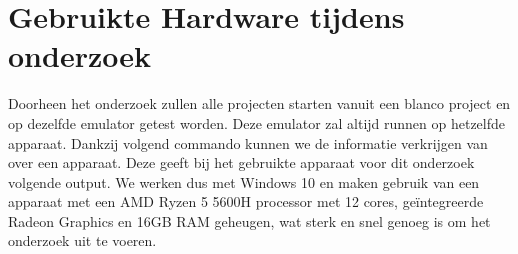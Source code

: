 \section{Gebruikte Hardware tijdens onderzoek}
Doorheen het onderzoek zullen alle projecten starten vanuit een blanco project en op dezelfde emulator 
getest worden. Deze emulator zal altijd runnen op hetzelfde apparaat. Dankzij volgend commando 
kunnen we de informatie verkrijgen van over een apparaat.
Deze geeft bij het gebruikte apparaat voor dit onderzoek volgende output.
We werken dus met Windows 10 en maken gebruik van een apparaat met een AMD Ryzen 5 5600H processor 
met 12 cores, geïntegreerde Radeon Graphics en 16GB RAM geheugen, wat sterk en snel 
genoeg is om het onderzoek uit te voeren.










